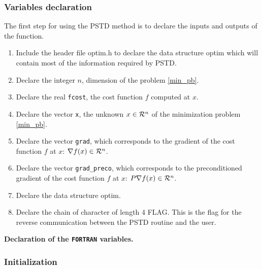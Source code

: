 \documentclass[a4paper,twoside,final,onecolumn,11pt,openright]{article}
\def \mathbb #1{{\cal #1}}
\begin{document}
\subsubsection{Variables declaration}
The first step for using the PSTD method is to declare the inputs and outputs of the function. 
\begin{enumerate}
 \item Include the header file optim.h to declare the data structure optim which will contain most of the information required by PSTD.
 \item Declare the integer $n$, dimension of the problem \eqref{min_pb}.
 \item Declare the real \texttt{fcost}, the cost function $f$ computed at $x$.
 \item Declare the vector \texttt{x}, the unknown $x \in \mathbb{R}^{n}$ of the minimization problem \eqref{min_pb}.
 \item Declare the vector \texttt{grad}, which corresponds to the gradient of the cost function $f$ at $x$: $\nabla f(x) \in \mathbb{R}^{n}$.
 \item Declare the vector \texttt{grad\_preco}, which corresponds to the preconditioned gradient of the cost function $f$ at $x$: $P\nabla f(x) \in \mathbb{R}^{n}$.  
 \item Declare the data structure optim.
 \item Declare the chain of character of length 4 FLAG. This is the flag for the reverse communication between the PSTD routine and the user. 
\end{enumerate}
\framebox{
\small
 
} 
\normalsize
\begin{center}
\textbf{Declaration of the \texttt{FORTRAN} variables.} 
\end{center}

\subsubsection{Initialization}
\end{document}
